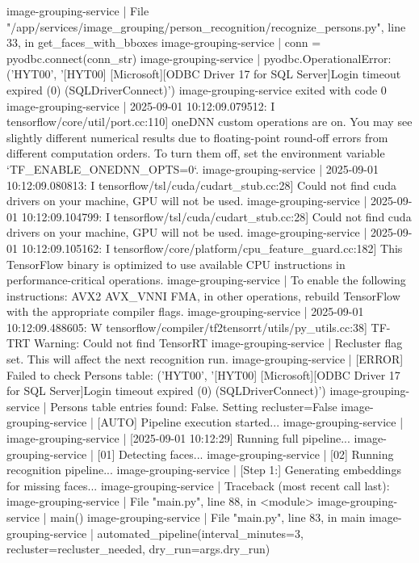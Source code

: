 image-grouping-service  |   File "/app/services/image_grouping/person_recognition/recognize_persons.py", line 33, in get_faces_with_bboxes
image-grouping-service  |     conn = pyodbc.connect(conn_str)
image-grouping-service  | pyodbc.OperationalError: ('HYT00', '[HYT00] [Microsoft][ODBC Driver 17 for SQL Server]Login timeout expired (0) (SQLDriverConnect)')
image-grouping-service exited with code 0
image-grouping-service  | 2025-09-01 10:12:09.079512: I tensorflow/core/util/port.cc:110] oneDNN custom operations are on. You may see slightly different numerical results due to floating-point round-off errors from different computation orders. To turn them off, set the environment variable `TF_ENABLE_ONEDNN_OPTS=0`.
image-grouping-service  | 2025-09-01 10:12:09.080813: I tensorflow/tsl/cuda/cudart_stub.cc:28] Could not find cuda drivers on your machine, GPU will not be used.
image-grouping-service  | 2025-09-01 10:12:09.104799: I tensorflow/tsl/cuda/cudart_stub.cc:28] Could not find cuda drivers on your machine, GPU will not be used.
image-grouping-service  | 2025-09-01 10:12:09.105162: I tensorflow/core/platform/cpu_feature_guard.cc:182] This TensorFlow binary is optimized to use available CPU instructions in performance-critical operations.
image-grouping-service  | To enable the following instructions: AVX2 AVX_VNNI FMA, in other operations, rebuild TensorFlow with the appropriate compiler flags.
image-grouping-service  | 2025-09-01 10:12:09.488605: W tensorflow/compiler/tf2tensorrt/utils/py_utils.cc:38] TF-TRT Warning: Could not find TensorRT
image-grouping-service  | Recluster flag set. This will affect the next recognition run.
image-grouping-service  | [ERROR] Failed to check Persons table: ('HYT00', '[HYT00] [Microsoft][ODBC Driver 17 for SQL Server]Login timeout expired (0) (SQLDriverConnect)')
image-grouping-service  | Persons table entries found: False. Setting recluster=False
image-grouping-service  | [AUTO] Pipeline execution started...
image-grouping-service  |
image-grouping-service  | [2025-09-01 10:12:29] Running full pipeline...
image-grouping-service  | [01] Detecting faces...
image-grouping-service  | [02] Running recognition pipeline...
image-grouping-service  | [Step 1:] Generating embeddings for missing faces...
image-grouping-service  | Traceback (most recent call last):
image-grouping-service  |   File "main.py", line 88, in <module>
image-grouping-service  |     main()
image-grouping-service  |   File "main.py", line 83, in main
image-grouping-service  |     automated_pipeline(interval_minutes=3, recluster=recluster_needed, dry_run=args.dry_run)
